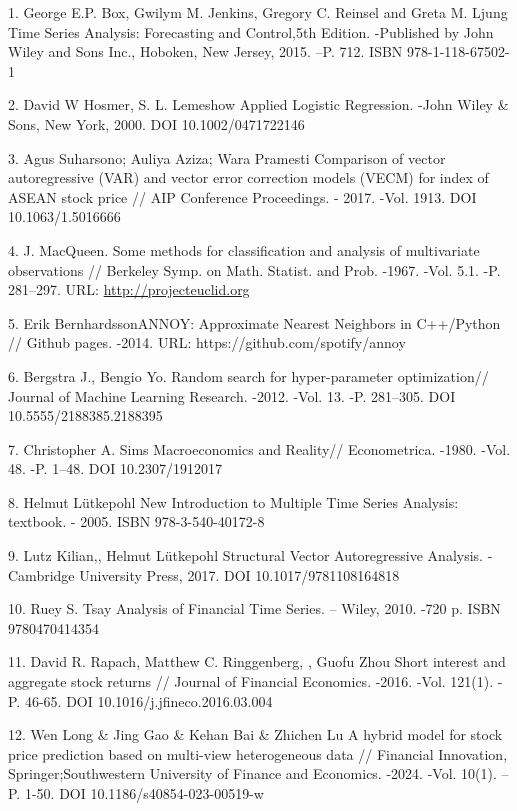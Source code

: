\begin{references}
1. George E.P. Box, Gwilym M. Jenkins, Gregory C. Reinsel and Greta M.
Ljung Time Series Analysis: Forecasting and Control,5th Edition.
-Published by John Wiley and Sons Inc., Hoboken, New Jersey, 2015. --P.
712. ISBN 978-1-118-67502-1

2. David W Hosmer, S. L. Lemeshow Applied Logistic Regression. -John
Wiley \& Sons, New York, 2000. DOI 10.1002/0471722146

3. Agus Suharsono; Auliya Aziza; Wara Pramesti Comparison of vector
autoregressive (VAR) and vector error correction models (VECM) for index
of ASEAN stock price // AIP Conference Proceedings. - 2017. -Vol. 1913.
DOI 10.1063/1.5016666

4. J. MacQueen. Some methods for classification and analysis of
multivariate observations // Berkeley Symp. on Math. Statist. and Prob.
-1967. -Vol. 5.1. -P. 281--297. URL:
\href{http://projecteuclid.org/euclid.bsmsp/1200512992}{http://projecteuclid.org}

5. Erik BernhardssonANNOY: Approximate Nearest Neighbors in C++/Python //
Github pages. -2014. URL: https://github.com/spotify/annoy

6. Bergstra J., Bengio Yo. Random search for hyper-parameter
optimization// Journal of Machine Learning Research. -2012. -Vol. 13.
-P. 281--305. DOI 10.5555/2188385.2188395

7. Christopher A. Sims Macroeconomics and Reality// Econometrica. -1980.
-Vol. 48. -P. 1--48. DOI 10.2307/1912017

8. Helmut Lütkepohl New Introduction to Multiple Time Series Analysis:
textbook. - 2005. ISBN 978-3-540-40172-8

9. Lutz Kilian,, Helmut Lütkepohl Structural Vector Autoregressive
Analysis. -Cambridge University Press, 2017. DOI 10.1017/9781108164818

10. Ruey S. Tsay Analysis of Financial Time Series. -- Wiley, 2010. -720
p. ISBN 9780470414354

11. David R. Rapach, Matthew C. Ringgenberg, , Guofu Zhou Short interest
and aggregate stock returns // Journal of Financial Economics. -2016.
-Vol. 121(1). -P. 46-65. DOI 10.1016/j.jfineco.2016.03.004

12. Wen Long \& Jing Gao \& Kehan Bai \& Zhichen Lu A hybrid model for
stock price prediction based on multi-view heterogeneous data //
Financial Innovation, Springer;Southwestern University of Finance and
Economics. -2024. -Vol. 10(1). --P. 1-50. DOI 10.1186/s40854-023-00519-w
\end{references}

